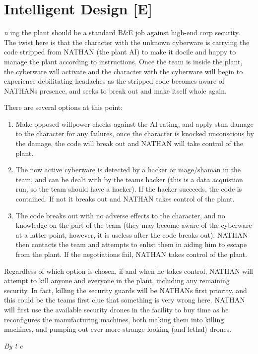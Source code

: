 \documentclass[letterpaper,twocolumn,10.5pt]{article}
\newenvironment{scenario}[6]
	{
		\section{#1 {\small[#2]}}
		\textit{#3}
		\def\TMPSCENARIO{#4 #5}
	}
	{\small\textit{By \TMPSCENARIO}}
\begin{document}
\begin{scenario}{Intelligent Design}
Entering the plant should be a standard B\&E job against high-end corp security. The twist here is that the character with the unknown cyberware is carrying the code stripped from \textsc{NATHAN} (the plant AI) to make it docile and happy to manage the plant according to instructions. Once the team is inside the plant, the cyberware will activate and the character with the cyberware will begin to experience debilitating headaches as the stripped code becomes aware of \textsc{NATHAN}s presence, and seeks to break out and make itself whole again.

There are several options at this point:

\begin{enumerate}
\item Make opposed willpower checks against the AI rating, and apply stun damage to the character for any failures, once the character is knocked unconscious by the damage, the code will break out and \textsc{NATHAN} will take control of the plant.

\item The now active cyberware is detected by a hacker or mage/shaman in the team, and can be dealt with by the teams hacker (this is a data acquistion run, so the team should have a hacker). If the hacker succeeds, the code is contained. If not it breaks out and \textsc{NATHAN} takes control of the plant.

\item The code breaks out with no adverse effects to the character, and no knowledge on the part of the team (they may become aware of the cyberware at a latter point, however, it is useless after the code breaks out). \textsc{NATHAN} then contacts the team and attempts to enlist them in aiding him to escape from the plant. If the negotiations fail, \textsc{NATHAN} takes control of the plant.

\end{enumerate}

Regardless of which option is chosen, if and when he takes control, \textsc{NATHAN} will attempt to kill anyone and everyone in the plant, including any remaining security. In fact, killing the security guards will be \textsc{NATHAN}s first priority, and this could be the teams first clue that something is very wrong here. \textsc{NATHAN} will first use the available security drones in the facility to buy time as he reconfigures the manufacturing machines, both making them into killing machines, and pumping out ever more strange looking (and lethal) drones.


\end{scenario}
\end{document}
